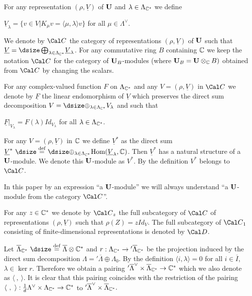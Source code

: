 For any representation $(\rho, \underline{V})$  of  ${\bold U}$  and $\lambda
\in
\Lambda_{{\Bbb C}^*}$  we define

$\underline{V}_\lambda = \{ v \in V\big\vert K_\mu v =
\langle \mu,\lambda\rangle v\}$  for all $\mu \in \Lambda^\vee$.

  We denote by  ${\Cal C}$  the category of
representations
$(\rho, \underline{V})$  of  ${\bold U}$  such that $\underline{V} =
{\dsize\bigoplus_{\lambda\in\Lambda_{{\Bbb C}^*}}} \underline{V}_\lambda$.
For any commutative ring $B$ containing ${\Bbb C}$  we keep the notation
${\Cal C}$  for the  category of  ${\bold U}_B$-modules (where
${\bold U}_B = {\bold U} \otimes_{\Bbb C} B)$  obtained from ${\Cal C}$ by
changing the scalars.
\endproclaim


For any complex-valued function  $F$  on $\Lambda_{{\Bbb C}^*}$ and any
$V = (\rho,\underline{V})$  in ${\Cal C}$  we denote by  $\underline{F}$  the
linear endomorphism of $\underline{V}$  which preserves the direct sum
decomposition  $V = {\dsize\oplus_{\lambda\in\Lambda_{{\Bbb C}^*}}} V_\lambda$
and such that

\noindent
$\underline{F}|_{V_\lambda} = F(\lambda)Id_{V_\lambda}$  for all
$\lambda \in \Lambda_{{\Bbb C}^*}$.

For any  $V = (\rho, \underline{V})$  in ${\Bbb C}$  we define
$\underline{V}^*$
as the direct sum  $\underline{V}^*\ {\dsize\buildrel{\text{def}}\over =}\
{\dsize\oplus_{\lambda\in\Lambda_{{\Bbb C}^*}}}
\text{Hom}(\underline{V}_\lambda,
{\Bbb C})$.  Then  $\underline{V}^*$  has a natural structure of a ${\bold
U}$-module.
We denote this ${\bold U}$-module as $V^*$.  By the definition  $V^*$  belongs
to
${\Cal C}$.


In this paper by an expression ``a ${\bold U}$-module'' we will always
understand
``a ${\bold U}$-module from the category ${\Cal C}$''.

  For any  $z \in {\Bbb C}^*$  we denote by  ${\Cal C}_z$
the
full subcategory of  ${\Cal C}$  of representations  $(\rho, \underline{V})$
such that  $\rho(Z) = z Id_V$.  The full subcategory of ${\Cal C}_1$
consisting
of finite-dimensional representations is denoted by  ${\Cal D}$.


  Let $\overline{\Lambda}_{{\Bbb C}^*}\
{\dsize\buildrel{\text{def}}\over =}\
\overline{\Lambda} \otimes {\Bbb C}^*$  and
$r: \Lambda_{{\Bbb C}^*} \to {}'\overline{\Lambda}_{{\Bbb C}^*}$  be
the projection induced by the direct sum decomposition $\Lambda =
{}'\overline{\Lambda} \oplus \Lambda_0$.  By the definition $\langle
i,\lambda\rangle
= 0$ for all $i \in \overline{I}$, $\lambda \in \ker r$.   Therefore we
obtain a pairing  ${}'\overline{\Lambda}^\vee  \times \overline{\Lambda}_{{\Bbb
C}^*}
\to {\Bbb C}^*$  which we also denote as  $\langle\ ,\ \rangle$.  It is clear
that this pairing coincides with the restriction of the pairing
$\langle\ ,\ \rangle: {\frac{1}{d}} \Lambda^\vee \times \Lambda_{{\Bbb C}^*}
\to
{\Bbb C}^*$  to  ${}'\overline{\Lambda}^\vee \times \overline{\Lambda}_{{\Bbb
C}^*}.$

